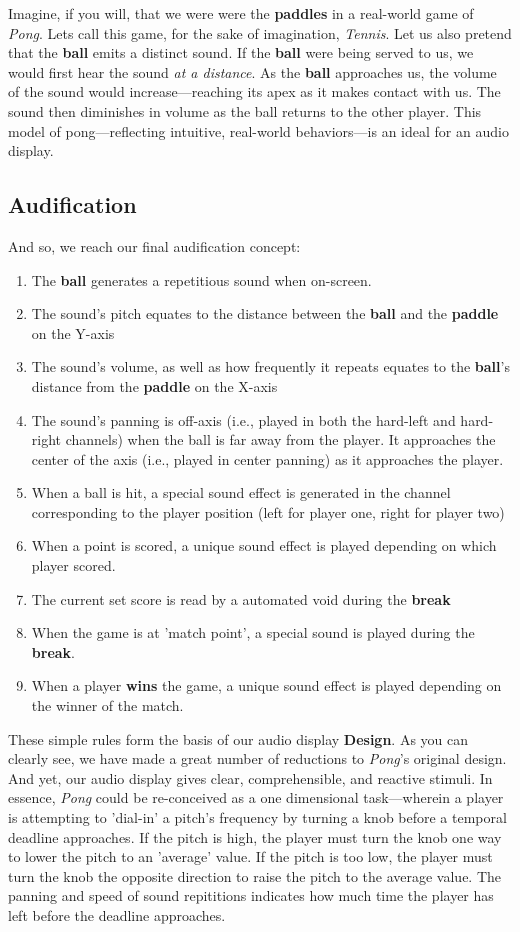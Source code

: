 \documentclass{report}
\newcommand{\design}{\textbf{Design}\xspace}
\newcommand{\state}[1]{\textbf{#1}}
\newcommand{\pad}{\textbf{paddle}\xspace}
\newcommand{\ball}{\textbf{ball}\xspace}
\begin{document}
Imagine, if you will, that we were were the \state{paddles} in a real-world game of \emph{Pong}. Lets call this game, for the sake of imagination, \emph{Tennis}. Let us also pretend that the \ball emits a distinct sound. If the \ball were being served to us, we would first hear the sound \emph{at a distance}. As the \ball approaches us, the volume of the sound would increase---reaching its apex as it makes contact with us. The sound then diminishes in volume as the ball returns to the other player. This model of pong---reflecting intuitive, real-world behaviors---is an ideal for an audio display.

\subsection{Audification}
And so, we reach our final audification concept:

\begin{enumerate}
    \item The \ball generates a repetitious sound when on-screen.
    \item The sound's pitch equates to the distance between the \ball and the \pad on the Y-axis
    \item The sound's volume, as well as how frequently it repeats equates to the \ball's distance from the \pad on the X-axis
    \item The sound's panning is off-axis (i.e., played in both the hard-left and hard-right channels) when the ball is far away from the player. It approaches the center of the axis (i.e., played in center panning) as it approaches the player.
    \item When a ball is hit, a special sound effect is generated in the channel corresponding to the player position (left for player one, right for player two)
    \item When a point is scored, a unique sound effect is played depending on which player scored.
    \item The current set score is read by a automated void during the \state{break}
    \item When the game is at 'match point', a special sound is played during the \state{break}.
    \item When a player \state{wins} the game, a unique sound effect is played depending on the winner of the match.
\end{enumerate}

These simple rules form the basis of our audio display \design. As you can clearly see, we have made a great number of reductions to \emph{Pong}'s original design. And yet, our audio display gives clear, comprehensible, and reactive stimuli. In essence, \emph{Pong} could be re-conceived as a one dimensional task---wherein a player is attempting to 'dial-in' a pitch's frequency by turning a knob before a temporal deadline approaches. If the pitch is high, the player must turn the knob one way to lower the pitch to an 'average' value. If the pitch is too low, the player must turn the knob the opposite direction to raise the pitch to the average value. The panning and speed of sound repititions indicates how much time the player has left before the deadline approaches.
\end{document}
